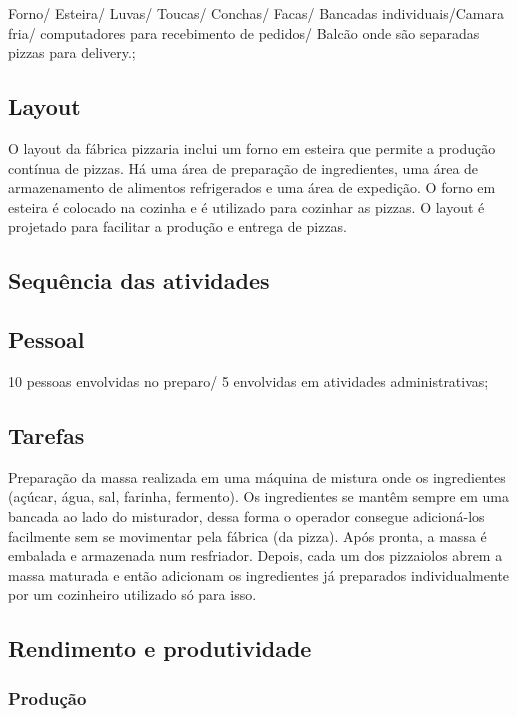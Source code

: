 \documentclass[11pt]{article}
\begin{document}
Forno/ Esteira/ Luvas/ Toucas/ Conchas/ Facas/ Bancadas individuais/Camara fria/ computadores para recebimento de pedidos/ Balcão onde são separadas pizzas para delivery.;


\subsection{Layout}

O layout da fábrica pizzaria inclui um forno em esteira que permite a produção contínua de pizzas. Há uma área de preparação de ingredientes, uma área de armazenamento de alimentos refrigerados e uma área de expedição. O forno em esteira é colocado na cozinha e é utilizado para cozinhar as pizzas. O layout é projetado para facilitar a produção e entrega de pizzas.


\subsection{Sequência das atividades}



\subsection{Pessoal}

10 pessoas envolvidas no preparo/ 5 envolvidas em atividades administrativas;


\subsection{Tarefas}

Preparação da massa realizada em uma máquina de mistura onde os ingredientes (açúcar, água, sal, farinha, fermento). Os ingredientes se mantêm sempre em uma bancada ao lado do misturador, dessa forma o operador consegue adicioná-los facilmente sem se movimentar pela fábrica (da pizza). Após pronta, a massa é embalada e armazenada num resfriador. Depois, cada um dos pizzaiolos abrem a massa maturada e então adicionam os ingredientes já preparados individualmente por um cozinheiro utilizado só para isso.  


\subsection{Rendimento e produtividade}



\subsubsection{Produção}
\end{document}

